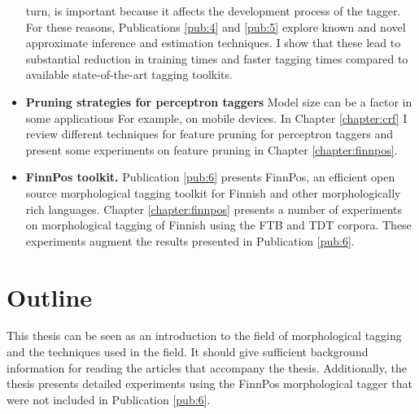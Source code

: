 \begin{itemize}
  turn, is important because it affects the development process of the
  tagger. For these reasons, Publications \ref{pub:4} and \ref{pub:5}
  explore known and novel approximate inference and estimation
  techniques. I show that these lead to substantial reduction in
  training times and faster tagging times compared to available
  state-of-the-art tagging toolkits.
\item {\bf Pruning strategies for perceptron taggers} Model size can
  be a factor in some applications For example, on mobile devices. In
  Chapter \ref{chapter:crf} I review different techniques for feature
  pruning for perceptron taggers and present some experiments on
  feature pruning in Chapter \ref{chapter:finnpos}.
\item {\bf FinnPos toolkit.} Publication \ref{pub:6} presents FinnPos,
  an efficient open source morphological tagging toolkit for Finnish
  and other morphologically rich languages. Chapter
  \ref{chapter:finnpos} presents a number of experiments on
  morphological tagging of Finnish using the FTB and TDT
  corpora. These experiments augment the results presented in
  Publication \ref{pub:6}.
\end{itemize}


\section{Outline}
This thesis can be seen as an introduction to the field of
morphological tagging and the techniques used in the field. It should
give sufficient background information for reading the articles that
accompany the thesis. Additionally, the thesis presents detailed
experiments using the FinnPos morphological tagger that were not
included in Publication \ref{pub:6}.

